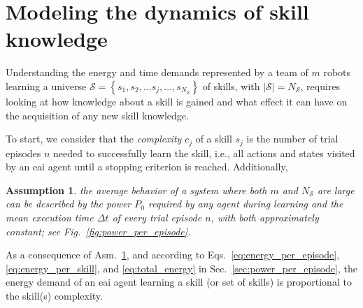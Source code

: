 \documentclass[12pt]{article}
\renewcommand{\emph}[1]{\textit{#1}}
\newtheorem{assumption}{Assumption}
\begin{document}
\section*{Modeling the dynamics of skill knowledge}\label{sec:knowledge_dynamics_model}
Understanding the energy and time demands represented by a team of $m$ robots learning a universe $\mathcal{S}=\left\lbrace s_1,s_2,\ldots s_j,\ldots, s_{N_\mathcal{S}}\right\rbrace$ of skills, with $|\mathcal{S}| = N_\mathcal{S}$, requires looking at how knowledge about a skill is gained and what effect it can have on the acquisition of any new skill knowledge. 

To start, we consider that the \emph{complexity} $c_j$ of a skill $ s_j $ is the number of trial episodes $n$ needed to successfully learn the skill, i.e., all actions and states visited by an \ac{eai} agent until a stopping criterion is reached. Additionally,
\begin{tcolorbox}
	\begin{assumption}\label{assumption:power_and_episode_time}
		the average behavior of a system where both $m$ and $N_\mathcal{S}$ are large can be described by the power $P_0$ required by any agent during learning and the mean execution time $\Delta t$ of every trial episode $n$, with both approximately constant; see Fig.~\ref{fig:power_per_episode}.
	\end{assumption}
\end{tcolorbox}
\noindent As a consequence of Asm.~\ref{assumption:power_and_episode_time}, and according to Eqs.~\eqref{eq:energy_per_episode},\eqref{eq:energy_per_skill}, and \eqref{eq:total_energy} in Sec.~\ref{sec:power_per_episode}, the energy demand of an \ac{eai} agent learning a skill (or set of skills) is proportional to the skill(s) complexity.

\end{document}
